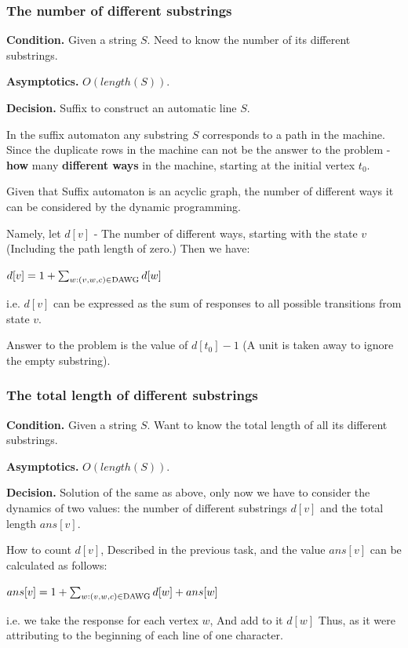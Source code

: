 \subsubsection{ The number of different substrings }

\textbf{Condition.} Given a string $S$. Need to know the number of its different substrings.

\textbf{Asymptotics.} $O (length (S))$.

\textbf{Decision.} Suffix to construct an automatic line $S$.

In the suffix automaton any substring $S$ corresponds to a path in the machine. Since the duplicate rows in the machine can not be the answer to the problem - \textbf{how} many \textbf{different ways} in the machine, starting at the initial vertex $t_0$.

Given that Suffix automaton is an acyclic graph, the number of different ways it can be considered by the dynamic programming.

Namely, let $d [v]$ - The number of different ways, starting with the state $v$ (Including the path length of zero.) Then we have:

$d[v]=1+\sum_{w:
(v,w,c)\in{\rm DAWG}}d[w]$

i.e. $d [v]$ can be expressed as the sum of responses to all possible transitions from state $v$.

Answer to the problem is the value of $d [t_0] -1$ (A unit is taken away to ignore the empty substring).

\subsubsection{ The total length of different substrings }

\textbf{Condition.} Given a string $S$. Want to know the total length of all its different substrings.

\textbf{Asymptotics.} $O (length (S))$.

\textbf{Decision.} Solution of the same as above, only now we have to consider the dynamics of two values: the number of different substrings $d [v]$ and the total length $ans [v]$.

How to count $d [v]$, Described in the previous task, and the value $ans [v]$ can be calculated as follows:

$ans[v]=1+\sum_{w:
(v,w,c)\in{\rm DAWG}}d[w]+ans[w]$

i.e. we take the response for each vertex $w$, And add to it $d [w]$ Thus, as it were attributing to the beginning of each line of one character.


